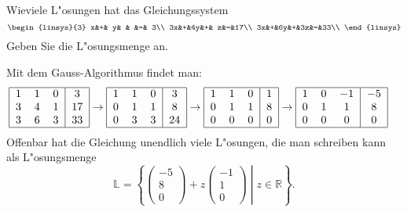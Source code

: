 Wieviele L"osungen hat das Gleichungssystem
\[
\begin{linsys}{3}
 x&+& y& &  &=& 3\\
3x&+&4y&+& z&=&17\\
3x&+&6y&+&3z&=&33\\
\end{linsys}
\]
Geben Sie die L"osungsmenge an.

\begin{loesung}
Mit dem Gauss-Algorithmus findet man:
\begin{align*}
\begin{tabular}{|ccc|c|}
\hline
1&1&0& 3\\
3&4&1&17\\
3&6&3&33\\
\hline
\end{tabular}
&\rightarrow
\begin{tabular}{|ccc|c|}
\hline
1&1&0& 3\\
0&1&1& 8\\
0&3&3&24\\
\hline
\end{tabular}
\rightarrow
\begin{tabular}{|ccc|c|}
\hline
1&1&0&1\\
0&1&1&8\\
0&0&0&0\\
\hline
\end{tabular}
\rightarrow
\begin{tabular}{|ccc|c|}
\hline
1&0&$-1$&$-5$\\
0&1&1&8\\
0&0&0&0\\
\hline
\end{tabular}
\end{align*}
Offenbar hat die Gleichung unendlich viele L"osungen,
die man schreiben kann als
L"osungsmenge
\[
\mathbb L=
\left\{
\left.
\begin{pmatrix}-5\\8\\0\end{pmatrix}+z\begin{pmatrix}-1\\1\\0\end{pmatrix}\;\right|\;z\in\mathbb R
\right\}.
\]
\end{loesung}


